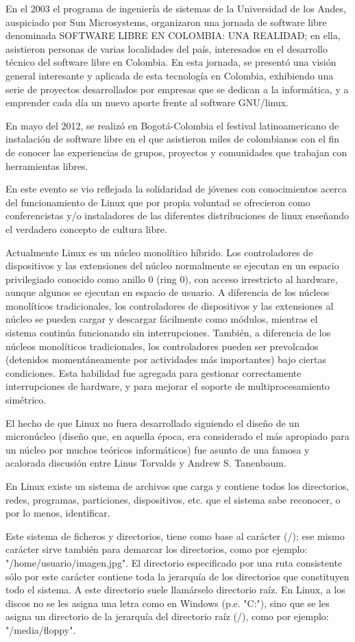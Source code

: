 En el 2003 el programa de ingeniería de sistemas de la
Universidad de los Andes, auspiciado por Sun Microsystems,
organizaron una jornada de software libre denominada
SOFTWARE LIBRE EN COLOMBIA: UNA REALIDAD; en ella,
asistieron personas de varias localidades del país, interesados
en el desarrollo técnico del software libre en Colombia. En esta
jornada, se presentó una visión general interesante y aplicada
de esta tecnología en Colombia, exhibiendo una serie de
proyectos desarrollados por empresas que se dedican a la
informática, y a emprender cada día un nuevo aporte frente al
software GNU/linux.

En mayo del 2012, se realizó en Bogotá-Colombia el festival
latinoamericano de instalación de software libre en el que
asistieron miles de colombianos con el fin de conocer las
experiencias de grupos, proyectos y comunidades que trabajan
con herramientas libres.

En este evento se vio reflejada la solidaridad de jóvenes con
conocimientos acerca del funcionamiento de Linux que por
propia voluntad se ofrecieron como conferencistas y/o
instaladores de las diferentes distribuciones de linux enseñando
el verdadero concepto de cultura libre.

Actualmente Linux es un núcleo monolítico híbrido. Los
controladores de dispositivos y las extensiones del núcleo
normalmente se ejecutan en un espacio privilegiado conocido
como anillo 0 (ring 0), con acceso irrestricto al hardware,
aunque algunos se ejecutan en espacio de usuario. A diferencia
de los núcleos monolíticos tradicionales, los controladores de
dispositivos y las extensiones al núcleo se pueden cargar y
descargar fácilmente como módulos, mientras el sistema
continúa funcionando sin interrupciones. También, a diferencia
de los núcleos monolíticos tradicionales, los controladores
pueden ser prevolcados (detenidos momentáneamente por
actividades más importantes) bajo ciertas condiciones. Esta
habilidad fue agregada para gestionar correctamente
interrupciones de hardware, y para mejorar el soporte
de multiprocesamiento simétrico.

El hecho de que Linux no fuera desarrollado siguiendo el diseño
de un micronúcleo (diseño que, en aquella época, era
considerado el más apropiado para un núcleo por muchos
teóricos informáticos) fue asunto de una famosa y acalorada
discusión entre Linus Torvalds y Andrew S. Tanenbaum.

En Linux existe un sistema de archivos que carga y contiene
todos los directorios, redes, programas, particiones, dispositivos,
etc. que el sistema sabe reconocer, o por lo menos, identificar.

Este sistema de ficheros y directorios, tiene como base al
carácter (/); ese mismo carácter sirve también para demarcar los
directorios, como por ejemplo: "/home/usuario/imagen.jpg". El
directorio especificado por una ruta consistente sólo por este
carácter contiene toda la jerarquía de los directorios que
constituyen todo el sistema. A este directorio suele llamárselo
directorio raíz. En Linux, a los discos no se les asigna una letra
como en Windows (p.e. "C:"), sino que se les asigna un directorio
de la jerarquía del directorio raíz (/), como por ejemplo:
"/media/floppy".
 



